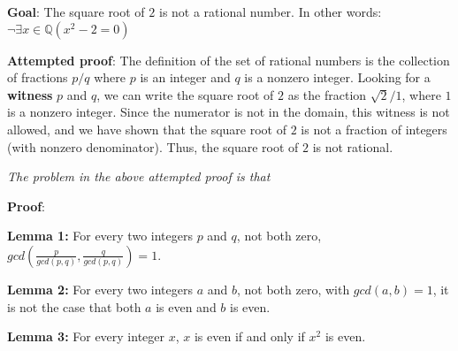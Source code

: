 

{\bf Goal}:  The square root of $2$ is not a rational number.  In other words: $\neg \exists x \in \mathbb{Q} ( x^2 -  2 = 0)$

{\bf Attempted proof}: The definition of the set of rational numbers is the collection of fractions $p/q$ where $p$ is an integer and $q$ is a nonzero integer. Looking for a {\bf witness} $p$ and $q$, we can write the square root of $2$ as the fraction 
$\sqrt{2 }/1$, where $1$ is a nonzero integer. Since the numerator is not in the domain, this witness is not allowed, and we have shown that the square root of $2$ is not a fraction of integers (with nonzero denominator). Thus, the square root of $2$ is not rational.


{\it The problem in the above attempted proof is that} \underline{\phantom{it only considers one candidate witness
and does not prove that no witnesses exist.}}


{\bf Proof}: 

\vfill

\vfill



{\bf Lemma 1:} For every two integers $p$  and  $q$, not both zero, $gcd\left( \frac{p}{gcd(p,q) },  \frac{q}{gcd(p,q)} \right) =  1$.


{\bf Lemma 2:} For every two integers $a$ and  $b$, not both zero, with  $gcd(a,b) = 1$, it is not the case that both $a$
is  even and $b$ is even.


{\bf Lemma 3:} For every integer  $x$, $x$ is  even if and only if $x^2$  is even.

\vfill